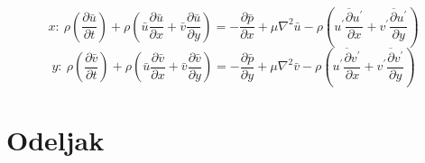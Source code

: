 \documentclass[12pt,serbian]{article} %
\numberwithin{figure}{section}
\numberwithin{table}{section}
\begin{document}
\begin{equation}
    x:\ \displaystyle \rho \left(\frac{\partial \bar{u} }{\partial t}\right) + \rho \left(\bar{u}\frac{\partial \bar{u} }{\partial x}+ \bar{v}\frac{\partial \bar{u} }{\partial y}\right) = - \frac{\partial \bar{p} }{\partial x} + \mu \nabla^{2}\bar{u} - \rho \left(\overline{u^{\prime}\frac{\partial u^{\prime}}{\partial x}} +\overline{v^{\prime}\frac{\partial u^{\prime}}{\partial y}}\right)
\end{equation}
\begin{equation}
    y:\ \displaystyle \rho \left(\frac{\partial \bar{v} }{\partial t}\right) + \rho \left(\bar{u}\frac{\partial \bar{v} }{\partial x}+ \bar{v}\frac{\partial \bar{v} }{\partial y}\right) = - \frac{\partial \bar{p} }{\partial y} + \mu \nabla^{2}\bar{v} - \rho \left(\overline{u^{\prime}\frac{\partial v^{\prime}}{\partial x}} +\overline{v^{\prime}\frac{\partial v^{\prime}}{\partial y}}\right)
\end{equation}

\clearpage
\section{Odeljak}
\end{document}
